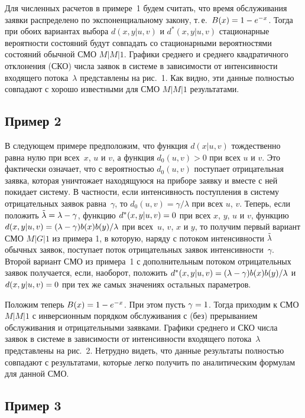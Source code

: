 \begin{multicols}{2}
Для численных расчетов в примере~1 будем считать, что
время обслуживания заявки распределено по
экспоненциальному закону, т.\,е.\ $B(x)\hm=1\hm-e^{-x}$.
Тогда при обоих вариантах выбора $d(x,y|u,v)$
и $d^*(x,y|u,v)$ стационарные вероятности
состояний будут совпадать со стационарными
вероятностями состояний обычной СМО $M|M|1$.
Графики среднего и среднего квадратичного отклонения
(СКО) числа заявок в системе
в зависимости от интенсивности входящего потока~$\lambda$ представлены на
рис.~1.
Как видно, эти данные полностью совпадают
с хорошо известными для СМО $M|M|1$ результатами.

\subsection{Пример 2}

 В следующем примере предположим, что функция
$d(x|u,v)$ тождественно равна нулю при всех~$x$, $u$
и $v$, а функция $d_0(u,v)>0$ при всех $u$ и $v$.
 Это фактически означает, что с вероятностью
$d_0(u,v)$ поступает отрицательная заявка,
которая уничтожает находящуюся на приборе
заявку и вместе с ней покидает систему.
 В частности, если интенсивность поступления
в систему отрицательных заявок равна~$\gamma$,
то $d_0(u,v)= \gamma/\lambda$
при всех $u$, $v$.
 Теперь, если положить $\tl\hm=\lambda - \gamma$,
функцию $d^*(x,y|u,v)\hm=0$ при
всех $x$, $y$, $u$ и $v$, функцию
$d(x,y|u,v)=(\lambda-\gamma) b(x)b(y)/\lambda$
при всех~$u$, $v$, $x$ и $y$, то получим первый
вариант СМО $M|G|1$ из примера 1, в которую,
наряду с потоком интенсивности $\tilde\lambda$ обычных
заявок, поступает поток отрицательных заявок
интенсивности~$\gamma$.
Второй вариант СМО из примера~1 с дополнительным
потоком отрицательных заявок получается,
если, наоборот, положить
$d^*(x,y|u,v)\hm=(\lambda\hm-\gamma) b(x)b(y) / \l$
и $d(x,y|u,v)\hm=0$ при тех же самых значениях остальных
параметров.


Положим теперь $B(x)\hm=1-e^{-x}$.  При этом пусть $\gamma\hm=1$.
 Тогда приходим к СМО $M|M|1$ с инверсионным порядком обслуживания
с (без) прерыванием обслуживания и отрицательными заявками.
 Графики среднего и СКО числа заявок в системе в зависимости от интенсивности входящего
потока~$\lambda$ представлены на рис.~2.
 Нетрудно видеть, что данные результаты
полностью совпадают с результатами, которые
легко получить по аналитическим формулам для данной СМО.


\subsection{Пример 3}


\end{multicols}
